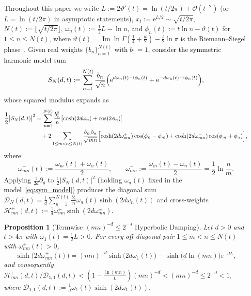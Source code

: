 \documentclass[11pt,reqno]{amsart}
\newtheorem{proposition}[theorem]{Proposition}
\theoremstyle{definition}
\theoremstyle{remark}
\numberwithin{equation}{section}
\newcommand{\ii}{\mathrm{i}}
\newcommand{\ee}{\mathrm{e}}
\DeclareMathOperator{\Ima}{Im}
\begin{document}
Throughout this paper we write $L := 2\vartheta'(t) = \ln(t/2\pi) + \mathcal{O}(t^{-2})$ (or $L = \ln(t/2\pi)$ in asymptotic statements), $x_t := \ee^{L/2} \sim \sqrt{t/2\pi}$, $N(t) := \lfloor\sqrt{t/2\pi}\rfloor$, $\omega_n(t) := \frac{1}{2}L - \ln n$, and $\phi_n(t) := t\ln n - \vartheta(t)$ for $1 \le n \le N(t)$, where $\vartheta(t) = \Ima\ln\Gamma(\frac{1}{4} + \frac{\ii t}{2}) - \frac{t}{2}\ln\pi$ is the Riemann--Siegel phase~\cite{siegel1932,gabcke1979}. Given real weights $\{b_n\}_{n=1}^{N(t)}$ with $b_1 = 1$, consider the symmetric harmonic model sum
\begin{equation}\label{eq:sym_model}
S_N(d,t) := \sum_{n=1}^{N(t)} \frac{b_n}{\sqrt{n}}\Bigl(\ee^{d\omega_n(t) - \ii\phi_n(t)} + \ee^{-d\omega_n(t) + \ii\phi_n(t)}\Bigr),
\end{equation}
whose squared modulus expands as
\begin{align*}
\frac{1}{2}\bigl\lvert S_N(d,t)\bigr\rvert^2 &= \sum_{n=1}^{N(t)} \frac{b_n^2}{n}\bigl[\cosh(2d\omega_n) + \cos(2\phi_n)\bigr] \\
&\quad + 2\sum_{1 \le m < n \le N(t)} \frac{b_m b_n}{\sqrt{mn}}\Bigl[\cosh(2d\omega_{mn}^+)\cos(\phi_n - \phi_m) + \cosh(2d\omega_{mn}^-)\cos(\phi_m + \phi_n)\Bigr],
\end{align*}
where
\begin{equation}\label{eq:omega_pm}
\omega_{mn}^+(t) := \frac{\omega_m(t) + \omega_n(t)}{2}, \qquad \omega_{mn}^- := \frac{\omega_m(t) - \omega_n(t)}{2} = \frac{1}{2}\ln\frac{n}{m}.
\end{equation}
Applying $\frac{1}{2d}\partial_d$ to $\frac{1}{2}\lvert S_N(d,t)\rvert^2$ (holding $\omega_n(t)$ fixed in the model~\eqref{eq:sym_model}) produces the diagonal sum $\mathcal{D}_N(d,t) = \frac{1}{d}\sum_{n=1}^{N(t)} \frac{b_n^2}{n}\omega_n(t)\sinh(2d\omega_n(t))$ and cross-weights $\mathcal{H}_{mn}^\pm(d,t) := \frac{1}{d}\omega_{mn}^\pm\sinh(2d\omega_{mn}^\pm)$.

\begin{proposition}[Termwise $(mn)^{-d} \le 2^{-d}$ Hyperbolic Damping]\label{prop:hyp_damping}
Let $d > 0$ and $t > 4\pi$ with $\omega_1(t) = \frac{1}{2}L > 0$. For every off-diagonal pair $1 \le m < n \le N(t)$ with $\omega_{mn}^+(t) > 0$,
\begin{equation}\label{eq:hyp_identity}
\sinh\bigl(2d\omega_{mn}^+(t)\bigr) = (mn)^{-d}\sinh\bigl(2d\omega_1(t)\bigr) - \sinh\bigl(d\ln(mn)\bigr)\ee^{-dL},
\end{equation}
and consequently $\mathcal{H}_{mn}^+(d,t)/\mathcal{D}_{1,1}(d,t) < (1 - \frac{\ln(mn)}{L})(mn)^{-d} < (mn)^{-d} \le 2^{-d} < 1$, where $\mathcal{D}_{1,1}(d,t) := \frac{1}{d}\omega_1(t)\sinh(2d\omega_1(t))$.
\end{proposition}
\end{document}
